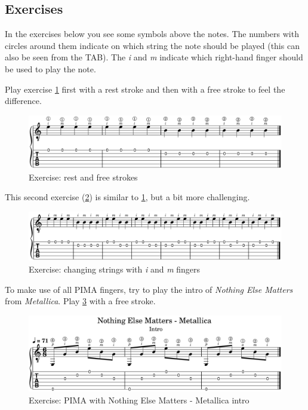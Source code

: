 \newpage

\subsection{Exercises}

In the exercises below you see some symbols above the notes. The numbers with circles around them indicate on which string the note should be played (this can also be seen from the TAB). The \textit{i} and \textit{m} indicate which right-hand finger should be used to play the note.

Play exercise \ref{fig:exercise_rest_free_stroke} first with a rest stroke and then with a free stroke to feel the difference.

\begin{figure}[h]
    \centering
    \includegraphics[width=\textwidth]{../../MuseScore/Guitar/OpenEnVallendeAanslag.png}
    \caption{Exercise: rest and free strokes}
    \label{fig:exercise_rest_free_stroke}
\end{figure}

This second exercise (\ref{fig:exercise_i_m_string_change}) is similar to \ref{fig:exercise_rest_free_stroke}, but a bit more challenging.

\begin{figure}[h]
    \centering
    \includegraphics[width=\textwidth]{../../MuseScore/Guitar/TwoStringAlternating.png}
    \caption{Exercise: changing strings with \textit{i} and \textit{m} fingers}
    \label{fig:exercise_i_m_string_change}
\end{figure}

To make use of all PIMA fingers, try to play the intro of \textit{Nothing Else Matters} from \textit{Metallica}. Play \ref{fig:exercise_nothing_else_matters_metallica_intro_pima} with a free stroke.

\begin{figure}[h]
    \centering
    \includegraphics[width=\textwidth]{../../MuseScore/Guitar/NothinElseMatters_Metallica_Intro.png}
    \caption{Exercise: PIMA with Nothing Else Matters - Metallica intro}
    \label{fig:exercise_nothing_else_matters_metallica_intro_pima}
\end{figure}


